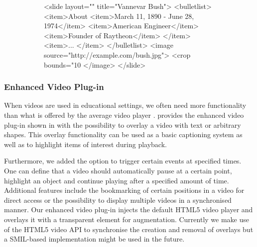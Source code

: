     \begin{figure}[h!]
      \begin{subfigure}{0.53\textwidth}
       \vspace{-1em}
       \begin{lstxml*}
<slide layout="" title="Vannevar Bush">
 <bulletlist>
  <item>About
   <item>March 11, 1890 - June 28, 1974</item>
   <item>American Engineer</item>
   <item>Founder of Raytheon</item>
  </item>
  <item>...
  </item>
 </bulletlist>
 <image source="http://example.com/bush.jpg">
  <crop bounds="10%
 </image>
</slide>
       \end{lstxml*}
      \end{subfigure}
      \hfill
      \begin{subfigure}{0.43\textwidth}
      \end{subfigure}
      \renewcommand{\figurename}{Listing}
      \renewcommand{\figureshortname}{Lst.}
     \end{figure}

    \subsubsection{Enhanced Video Plug-in}

     When videos are used in educational settings, we often need more
     functionality than what is offered by the average video player
     \citep{reuss-1}. \mxp provides the enhanced video plug-in shown in
      with the possibility to overlay a video with text
     or arbitrary shapes. This overlay functionality can be used as a basic
     captioning system as well as to highlight items of interest during
     playback.

     Furthermore, we added the option to trigger certain events at specified
     times. One can define that a video should automatically pause at a certain
     point, highlight an object and continue playing after a specified amount
     of time. Additional features include the bookmarking of certain positions
     in a video for direct access or the possibility to display multiple videos
     in a synchronised manner. Our enhanced video plug-in injects the default
     HTML5 video player and overlays it with a transparent  element
     for augmentation. Currently we make use of the HTML5 video API to
     synchronise the creation and removal of overlays but a SMIL-based
     implementation might be used in the future.

